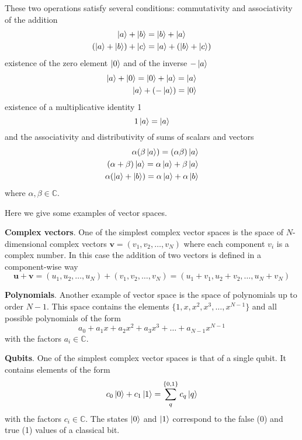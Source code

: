 \documentclass[../Main/chem532-notes.tex]{subfiles}
\begin{document}
These two operations satisfy several conditions: commutativity and associativity of the addition 
\begin{equation}
\begin{split}
\ket{a} +\ket{b} &= \ket{b} + \ket{a} \\
(\ket{a} +\ket{b}) +\ket{c} &= \ket{a} + (\ket{b} + \ket{c})
\end{split}
\end{equation}
existence of the zero element $\ket{0}$ and of the inverse $-\ket{a}$
\begin{equation}
\begin{split}
\ket{a} +\ket{0} = \ket{0} + \ket{a} = \ket{a} \\
\ket{a} + (-\ket{a}) = \ket{0}
\end{split}
\end{equation}
existence of a multiplicative identity 1
\begin{equation}
1 \ket{a} = \ket{a}
\end{equation}
and the associativity and distributivity of sums of scalars and vectors
\begin{equation}
\begin{split}
\alpha (\beta \ket{a}) = (\alpha \beta) \ket{a} \\
(\alpha + \beta) \ket{a} = \alpha \ket{a}  + \beta \ket{a} \\
\alpha (\ket{a} + \ket{b}) = \alpha \ket{a} + \alpha \ket{b}
\end{split}
\end{equation}
where $\alpha,\beta \in \mathbb{C}$.

\begin{example}
Here we give some examples of vector spaces.

\textbf{Complex vectors}. One of the simplest complex vector spaces is the space of $N$-dimensional complex vectors $\mathbf{v} = (v_1, v_2, \ldots, v_N)$ where each component $v_i$ is a complex number.
In this case the addition of two vectors is defined in a component-wise way
\begin{equation}
\mathbf{u} + \mathbf{v} = (u_1, u_2, \ldots, u_N) + (v_1, v_2, \ldots, v_N) = (u_1 + v_1, u_2 + v_2, \ldots, u_N + v_N)
\end{equation}

\textbf{Polynomials}. Another example of vector space is the space of polynomials up to order $N - 1$.
This space contains the elements $\{1, x, x^2, x^3, \ldots, x^{N-1} \}$ and all possible polynomials of the form
\begin{equation}
a_0 + a_1 x + a_2 x^2 + a_3 x^3 + \ldots + a_{N - 1} x^{N-1} 
\end{equation}
with the factors $a_i \in \mathbb{C}$.

\textbf{Qubits}. One of the simplest complex vector spaces is that of a single qubit. It contains elements of the form
\begin{equation}
c_0 \ket{0} + c_1 \ket{1} = \sum_q^{\{0,1\}} c_q \ket{q}
\end{equation}
with the factors $c_i \in \mathbb{C}$. The states $\ket{0}$ and $\ket{1}$ correspond to the false (0) and true (1) values of a classical bit.
\end{example}
\end{document}
